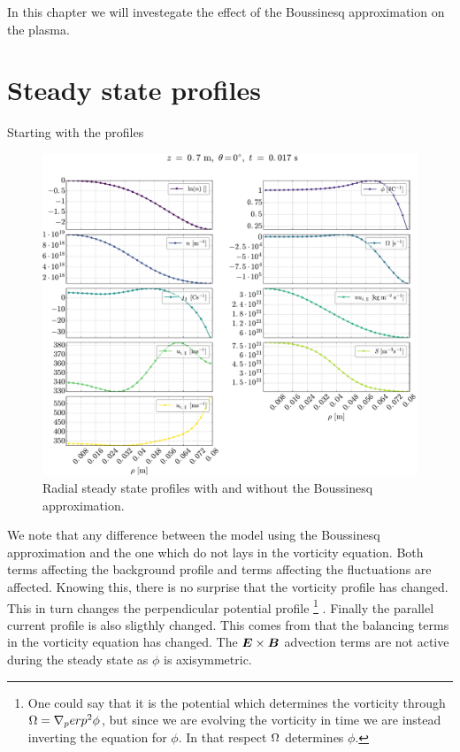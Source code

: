 In this chapter we will investegate the effect of the Boussinesq approximation on the plasma.

\section{Steady state profiles}
Starting with the profiles
%
\begin{figure}[htb]
    \centering
    \includegraphics[width=1.0\textwidth]{fig/results/compareBouss/1DProfRad001B}
    \caption{Radial steady state profiles with and without the Boussinesq approximation.}
    \label{fig:compareBoussProfRad}
\end{figure}
%
We note that any difference between the model using the Boussinesq approximation and the one which do not lays in the vorticity equation.
Both terms affecting the background profile and terms affecting the fluctuations are affected.
Knowing this, there is no surprise that the vorticity profile has changed.
This in turn changes the perpendicular potential profile%
%
\footnote{One could say that it is the potential which determines the vorticity through $\Omega = \nabla_perp^2 \phi$, but since we are evolving the vorticity in time we are instead inverting the equation for $\phi$.
In that respect $\Omega$ determines $\phi$.}%
%
.
Finally the parallel current profile is also sligthly changed.
This comes from that the balancing terms in the vorticity equation has changed.
The $\boldsymbol{E}\times\boldsymbol{B}$ advection terms are not active during the steady state as $\phi$ is axisymmetric.
